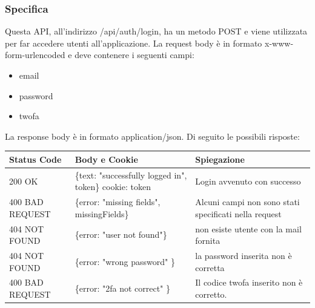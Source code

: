 \documentclass{report}
\begin{document}
\subsubsection*{Specifica}
Questa API, all'indirizzo /api/auth/login, ha un metodo POST e viene utilizzata per far accedere utenti all'applicazione.
La request body è in formato x-www-form-urlencoded e deve contenere i seguenti campi:
\begin{itemize}
	\item email
	\item password
	\item twofa
\end{itemize}
La response body è in formato application/json. Di seguito le possibili risposte:
\begin{center} %
	\centering
	\begin{tabular}{ |p{4cm}|p{5cm}|p{4cm}| }
		\hline
		\centering Status Code & \qquad\quad Body e Cookie                               & \qquad\qquad Spiegazione                              \\ %
		\hline
		200 OK                 & \{text: "successfully logged in", token\} cookie: token & Login avvenuto con successo                           \\
		\hline
		400 BAD REQUEST        & \{error: "missing fields", missingFields\}              & Alcuni campi non sono stati specificati nella request \\ %
		\hline
		404 NOT FOUND          & \{error: "user not found"\}                             & non esiste utente con la mail fornita                 \\%
		\hline
		404 NOT FOUND          & \{error: "wrong password" \}                            & la password inserita non è corretta                   \\
		\hline
		400 BAD REQUEST        & \{error: "2fa not correct" \}                           & Il codice twofa inserito non è corretto.              \\
		\hline
	\end{tabular}
\end{center}
\end{document}
